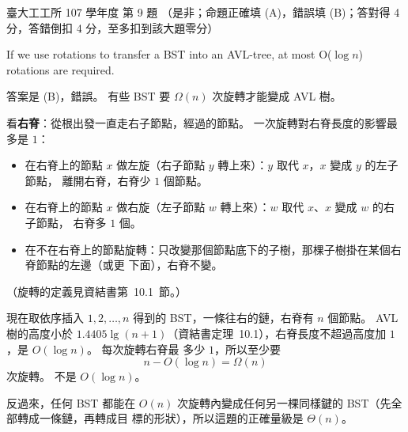 \begin{pastexam}[label={px:ntu-107-ie-ds-09}]{臺大工工所 107 學年度 第 9 題}
（是非；命題正確填 (A)，錯誤填 (B)；答對得 4 分，答錯倒扣 4 分，至多扣到該大題零分）

If we use rotations to transfer a BST into an AVL-tree, at most O($\log n$) rotations are required.
\end{pastexam}

\begin{pastsoln}
答案是 (B)，錯誤。 有些 BST 要 $\Omega(n)$ 次旋轉才能變成 AVL 樹。

看\textbf{右脊}：從根出發一直走右子節點，經過的節點。 一次旋轉對右脊長度的影響最多是 $1$：
\begin{itemize}
\item 在右脊上的節點 $x$ 做左旋（右子節點 $y$ 轉上來）：$y$ 取代 $x$，$x$ 變成 $y$ 的左子節點，
離開右脊，右脊少 $1$ 個節點。
\item 在右脊上的節點 $x$ 做右旋（左子節點 $w$ 轉上來）：$w$ 取代 $x$、$x$ 變成 $w$ 的右子節點，
右脊多 $1$ 個。
\item 在不在右脊上的節點旋轉：只改變那個節點底下的子樹，那棵子樹掛在某個右脊節點的左邊（或更
下面），右脊不變。
\end{itemize}
（旋轉的定義見資結書第~10.1~節。）

現在取依序插入 $1, 2, \ldots, n$ 得到的 BST，一條往右的鏈，右脊有 $n$ 個節點。 AVL 樹的高度小於
$1.4405 \lg(n + 1)$（資結書定理~10.1），右脊長度不超過高度加 $1$，是 $O(\log n)$。 每次旋轉右脊最
多少 $1$，所以至少要
\[
n - O(\log n) = \Omega(n)
\]
次旋轉。 不是 $O(\log n)$。

反過來，任何 BST 都能在 $O(n)$ 次旋轉內變成任何另一棵同樣鍵的 BST（先全部轉成一條鏈，再轉成目
標的形狀），所以這題的正確量級是 $\Theta(n)$。
\end{pastsoln}
